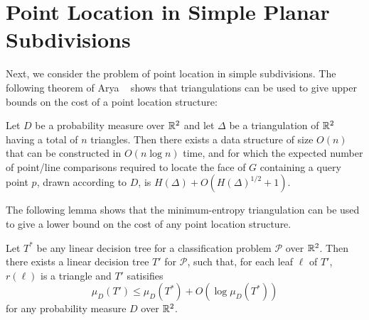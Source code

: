 \documentclass[lotsofwhite]{patmorin}
\begin{document}
\section{Point Location in Simple Planar Subdivisions}

Next, we consider the problem of point location in simple
subdivisions.  The following theorem of Arya \etal\ \cite{ammw07}
shows that triangulations can be used to give upper bounds on the cost
of a point location structure:

\begin{thm}
Let $D$ be a probability measure over $\mathbb{R}^2$ and let $\Delta$ be a
triangulation of $\mathbb{R}^2$ having a total of $n$ triangles.  Then there exists a
data structure of size $O(n)$ that can be constructed in $O(n\log n)$
time, and for which the expected number of point/line comparisons
required to locate the face of $G$ containing a query point $p$, drawn
according to $D$, is $H(\Delta) + O(H(\Delta)^{1/2}+1)$.
\end{thm}

The following lemma shows that the minimum-entropy triangulation can
be used to give a lower bound on the cost of any point location
structure.

\begin{lem}
Let $T^*$ be any linear decision tree for a classification problem
$\mathcal{P}$ over $\mathbb{R}^2$.  Then there exists a linear decision tree
$T'$ for $\mathcal{P}$, such that, for each leaf $\ell$ of $T'$,
$r(\ell)$ is a triangle and $T'$ satisifies
\[
    \mu_D(T') \le \mu_D(T^*) + O(\log\mu_D(T^*))
\]
for any probability measure $D$ over $\mathbb{R}^2$.
\end{lem}
\end{document}
